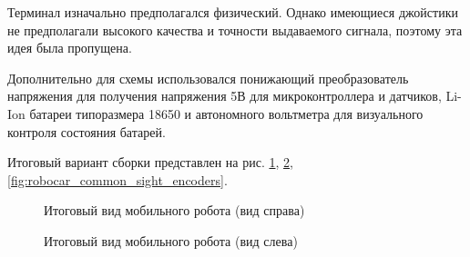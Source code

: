 \documentclass[14pt,a4paper,russian]{scrartcl}
\begin{document}
Терминал изначально предполагался физический. Однако имеющиеся джойстики
не предполагали высокого качества и точности выдаваемого сигнала, поэтому
эта идея была пропущена.

Дополнительно для схемы использовался понижающий преобразователь
напряжения для получения напряжения 5В для микроконтроллера и датчиков, 
Li-Ion батареи типоразмера 18650 и автономного вольтметра для 
визуального контроля состояния батарей.

Итоговый вариант сборки представлен на рис. \ref{fig:robocar_common_sight_right},
\ref{fig:robocar_common_sight_left}, \ref{fig:robocar_common_sight_encoders}.
\begin{figure}[h!]
    \caption{Итоговый вид мобильного робота (вид справа)}
    \label{fig:robocar_common_sight_right}
\end{figure}
\begin{figure}[h!]
    \caption{Итоговый вид мобильного робота (вид слева)}
    \label{fig:robocar_common_sight_left}
\end{figure}
\end{document}
